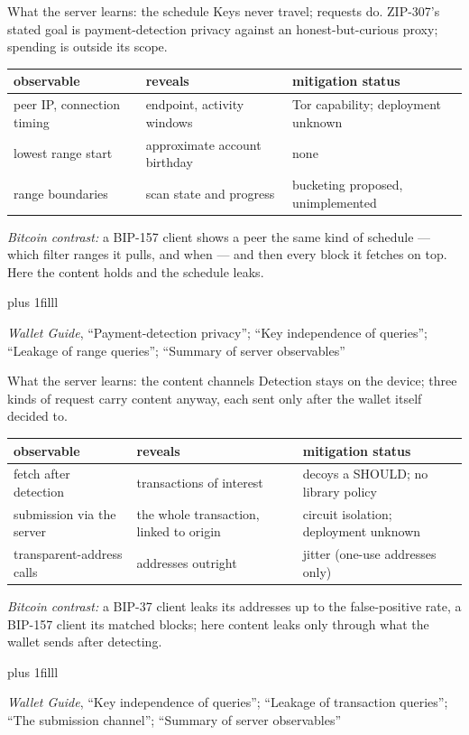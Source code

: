 \documentclass[aspectratio=169,11pt]{beamer}
\newcommand{\src}[1]{\par\vskip0pt plus 1filll
  {\fontsize{6}{7.2}\selectfont\color{arbdim}\raggedright #1\par}}
\begin{document}
\begin{frame}{What the server learns: the schedule}
Keys never travel; requests do. ZIP-307's stated goal is payment-detection
privacy against an honest-but-curious proxy; spending is outside its scope.
\begin{center}\small
\begin{tabular}{@{}p{}p{}p{}@{}}
\toprule
observable & reveals & mitigation status \tabularnewline
\midrule
\raggedright peer IP, connection timing &
  \raggedright endpoint, activity windows &
  \raggedright Tor capability; deployment unknown \tabularnewline
\raggedright lowest range start & \raggedright approximate account
  birthday & \raggedright none \tabularnewline
\raggedright range boundaries & \raggedright scan state and progress &
  \raggedright bucketing proposed, unimplemented \tabularnewline
\bottomrule
\end{tabular}
\end{center}
\smallskip
\emph{Bitcoin contrast:} a BIP-157 client shows a peer the same kind of
schedule --- which filter ranges it pulls, and when --- and then every
block it fetches on top. Here the content holds and the schedule leaks.
\src{\emph{Wallet Guide}, ``Payment-detection privacy''; ``Key independence of
  queries''; ``Leakage of range queries''; ``Summary of server observables''}
\end{frame}

\begin{frame}{What the server learns: the content channels}
Detection stays on the device; three kinds of request carry content
anyway, each sent only after the wallet itself decided to.
\begin{center}\small
\begin{tabular}{@{}p{}p{}p{}@{}}
\toprule
observable & reveals & mitigation status \tabularnewline
\midrule
\raggedright fetch after detection &
  \raggedright\leavevmode\textcolor{arbred}{transactions of interest} &
  \raggedright decoys a SHOULD; no library policy \tabularnewline
\raggedright submission via the server &
  \raggedright the whole transaction, linked to origin &
  \raggedright circuit isolation; deployment unknown \tabularnewline
\raggedright transparent-address calls & \raggedright addresses outright &
  \raggedright jitter (one-use addresses only) \tabularnewline
\bottomrule
\end{tabular}
\end{center}
\smallskip
\emph{Bitcoin contrast:} a BIP-37 client leaks its addresses up to the
false-positive rate, a BIP-157 client its matched blocks; here content
leaks only through what the wallet sends after detecting.
\src{\emph{Wallet Guide}, ``Key independence of queries''; ``Leakage of
  transaction queries''; ``The submission channel''; ``Summary of server
  observables''}
\end{frame}
\end{document}
